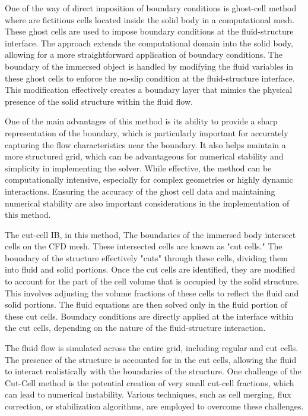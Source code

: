 One of the way of direct imposition of boundary conditions is ghost-cell method where are fictitious cells located inside the solid body in a computational mesh. These ghost cells are used to impose boundary conditions at the fluid-structure interface. The approach extends the computational domain into the solid body, allowing for a more straightforward application of boundary conditions. The boundary of the immersed object is handled by modifying the fluid variables in these ghost cells to enforce the no-slip condition at the fluid-structure interface. This modification effectively creates a boundary layer that mimics the physical presence of the solid structure within the fluid flow. 

One of the main advantages of this method is its ability to provide a sharp representation of the boundary, which is particularly important for accurately capturing the flow characteristics near the boundary. It also helps maintain a more structured grid, which can be advantageous for numerical stability and simplicity in implementing the solver. While effective, the method can be computationally intensive, especially for complex geometries or highly dynamic interactions. Ensuring the accuracy of the ghost cell data and maintaining numerical stability are also important considerations in the implementation of this method.

The cut-cell IB, in this method, The boundaries of the immersed body intersect cells on the CFD mesh. These intersected cells are known as "cut cells." The boundary of the structure effectively "cuts" through these cells, dividing them into fluid and solid portions. Once the cut cells are identified, they are modified to account for the part of the cell volume that is occupied by the solid structure. This involves adjusting the volume fractions of these cells to reflect the fluid and solid portions. The fluid equations are then solved only in the fluid portion of these cut cells. Boundary conditions are directly applied at the interface within the cut cells, depending on the nature of the fluid-structure interaction.

The fluid flow is simulated across the entire grid, including regular and cut cells. The presence of the structure is accounted for in the cut cells, allowing the fluid to interact realistically with the boundaries of the structure. One challenge of the Cut-Cell method is the potential creation of very small cut-cell fractions, which can lead to numerical instability. Various techniques, such as cell merging, flux correction, or stabilization algorithms, are employed to overcome these challenges. 

